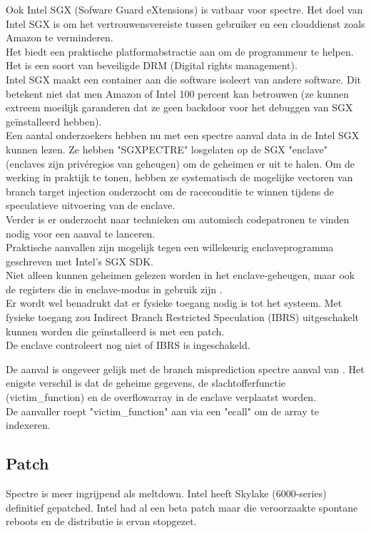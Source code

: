 Ook Intel SGX (Sofware Guard eXtensions) is vatbaar voor spectre. 
Het doel van Intel SGX is om het vertrouwensvereiste tussen gebruiker en een clouddienst zoals Amazon te verminderen.\\
Het biedt een praktische platformabstractie aan om de programmeur te helpen. 
Het is een soort van beveiligde DRM (Digital rights management).\\
Intel SGX maakt een container aan die software isoleert van andere software.
Dit betekent niet dat men Amazon of Intel 100 percent kan betrouwen (ze kunnen extreem moeilijk garanderen dat ze geen backdoor voor het debuggen van SGX geïnstalleerd hebben).\\
Een aantal onderzoekers hebben nu met een spectre aanval data in de Intel SGX kunnen lezen.
Ze hebben "SGXPECTRE" losgelaten op de SGX "enclave" (enclaves zijn privéregios van geheugen) om de geheimen er uit te halen.
Om de werking in praktijk te tonen, hebben ze systematisch de mogelijke vectoren van branch target injection onderzocht om de raceconditie te winnen tijdens de speculatieve uitvoering van de enclave.\\ Verder is er onderzocht naar technieken om automisch codepatronen te vinden nodig voor een aanval te lanceren.\\ Praktische aanvallen zijn mogelijk tegen een willekeurig  enclaveprogramma geschreven met Intel's SGX SDK.\\ Niet alleen kunnen geheimen gelezen worden in het enclave-geheugen, maar ook de registers die in enclave-modus in gebruik zijn \parencite{Chen2018}.\\
Er wordt wel benadrukt dat er fysieke toegang nodig is tot het systeem. Met fysieke toegang zou Indirect Branch Restricted Speculation (IBRS) uitgeschakelt kunnen worden die geïnstalleerd is met een patch.\\
De enclave controleert nog niet of IBRS is ingeschakeld.

De aanval is ongeveer gelijk met de branch misprediction spectre aanval van \parencite{kocher}. Het enigste verschil is dat de geheime gegevens, de slachtofferfunctie (victim\_function) en de overflowarray in de enclave verplaatst worden.\\
De aanvaller roept "victim\_function" aan via een "ecall" om de array te indexeren. \parencite{Tian2018}



\subsection{Patch}
Spectre is meer ingrijpend als meltdown.
Intel heeft Skylake (6000-series) definitief gepatched.
Intel had al een beta patch maar die veroorzaakte spontane reboots en de distributie is ervan stopgezet.

